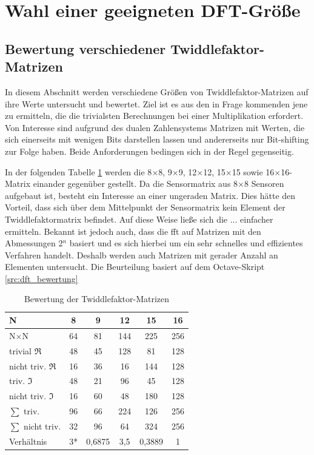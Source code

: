 \section{Wahl einer geeigneten DFT-Größe}

\subsection{Bewertung verschiedener Twiddlefaktor-Matrizen}\label{sec:AnalyseBewertungTwiddlefaktornMatrizen}

In diesem Abschnitt werden verschiedene Größen von Twiddlefaktor-Matrizen auf ihre Werte untersucht und bewertet.
Ziel ist es aus den in Frage kommenden jene zu ermitteln, die die trivialsten Berechnungen bei einer 
Multiplikation erfordert. Von Interesse sind aufgrund des dualen Zahlensystems Matrizen mit Werten, die sich einerseits 
mit wenigen Bits darstellen lassen und andererseits nur Bit-shifting zur Folge haben. Beide Anforderungen bedingen 
sich in der Regel gegenseitig.

In der folgenden Tabelle \ref{tab:TwiddlefaktorMatrizenBewertung} werden die 8$\times$8, 9$\times$9, 12$\times$12, 15$\times$15 sowie 16$\times$16-Matrix einander gegenüber gestellt.
Da die Sensormatrix aus 8$\times$8 Sensoren aufgebaut ist, besteht ein Interesse an einer ungeraden Matrix. Dies hätte den Vorteil, dass
sich über dem Mittelpunkt der Sensormatrix kein Element der Twiddlefaktormatrix befindet. Auf diese Weise ließe sich die ... einfacher ermitteln.
Bekannt ist jedoch auch,
dass die \gls{fft} auf Matrizen mit den Abmessungen 2$^n$ basiert und es sich hierbei um ein sehr schnelles und effizientes Verfahren handelt. 
Deshalb werden auch Matrizen mit gerader Anzahl an Elementen untersucht.
Die Beurteilung basiert auf dem Octave-Skript \ref{src:dft_bewertung}


 \vspace{1cm}
 \begingroup
  \renewcommand*{\arraystretch}{1.2} %
  \begin{table}[!ht]
  \centering
  \caption{Bewertung der Twiddlefaktor-Matrizen}
   \begin{tabular}{l|ccccc}   
    N					& 8	& 9	& 12	& 15		& 16 \\
    \hline
    N$\times$N				& 64	& 81	& 144	& 225		& 256 \\
    trivial $\Re$ 			& 48	& 45	& 128	& 81		& 128 \\
    nicht triv. $\Re$			& 16	& 36	& 16	& 144		& 128 \\
    triv. $\Im$ 			& 48	& 21	& 96	& 45		& 128 \\
    nicht triv. $\Im$ 			& 16	& 60	& 48	& 180		& 128 \\
    $\sum$ triv. 			& 96	& 66	& 224	& 126		& 256 \\
    $\sum$ nicht triv. 			& 32	& 96	& 64	& 324		& 256 \\
    Verhältnis 				& 3*	& 0,6875& 3,5	& 0,3889	& 1
   \end{tabular}
   \label{tab:TwiddlefaktorMatrizenBewertung}
  \end{table}
 \endgroup
 \vspace{1cm}
 
